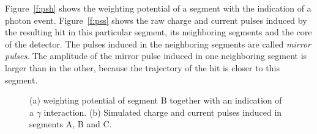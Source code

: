 \documentclass[epj]{svjour}
\begin{document}
Figure~\ref{f:psh} shows the weighting potential of a segment with the
indication of a photon event. Figure~\ref{f:pss} shows the raw charge
and current pulses induced by the resulting hit in this particular
segment, its neighboring segments and the core of the detector. The
pulses induced in the neighboring segments are called \emph{mirror
pulses}. The amplitude of the mirror pulse induced in one neighboring
segment is larger than in the other, because the trajectory of the hit
is closer to this segment.
\begin{figure}[htbp] 
\centering 
{}%
% 
\caption{(a) weighting potential of segment B together with an
indication of a $\gamma$ interaction. (b) Simulated charge and current
pulses induced in segments A, B and C.}
\label{f:ps} 
\end{figure} 
\end{document}
